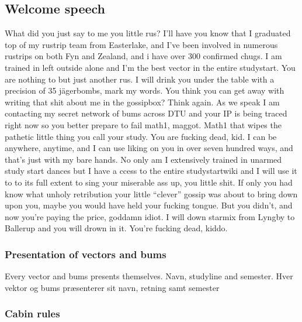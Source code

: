 \documentclass[../../../main.tex]{subfiles}
\begin{document}
\subsection{Welcome speech}
What did you just say to me you little rus? I'll have you know that I graduated top of my rustrip team from Easterlake, and I've been involved in numerous rustrips on both Fyn and Zealand, and i have over 300 confirmed chugs. I am trained in left outside alone and I'm the best vector in the entire studystart. You are nothing to but just another rus. I will drink you under the table with a precision of 35 jägerbombs, mark my words. You think you can get away with writing that shit about me in the gossipbox? Think again. As we speak I am contacting my secret network of bums across DTU and your IP is being traced right now so you better prepare to fail math1, maggot. Math1 that wipes the pathetic little thing you call your study. You are fucking dead, kid. I can be anywhere, anytime, and I can use liking on you in over seven hundred ways, and that's just with my bare hands. No only am I extensively trained in unarmed study start dances but I have a ccess to the entire studystartwiki and I will use it to to its full extent to sing your miserable ass up, you little shit. If only you had know what unholy retribution your little ``clever'' gossip was about to bring down upon you, maybe you would have held your fucking tongue. But you didn't, and now you're paying the price, goddamn idiot. I will down starmix from Lyngby to Ballerup and you will drown in it. You're fucking dead, kiddo.

\subsubsection{Presentation of vectors and bums}
Every vector and bums presents themselves. Navn, studyline and semester.
Hver vektor og bums præsenterer sit navn, retning samt semester


\subsubsection{Cabin rules}
\end{document}
